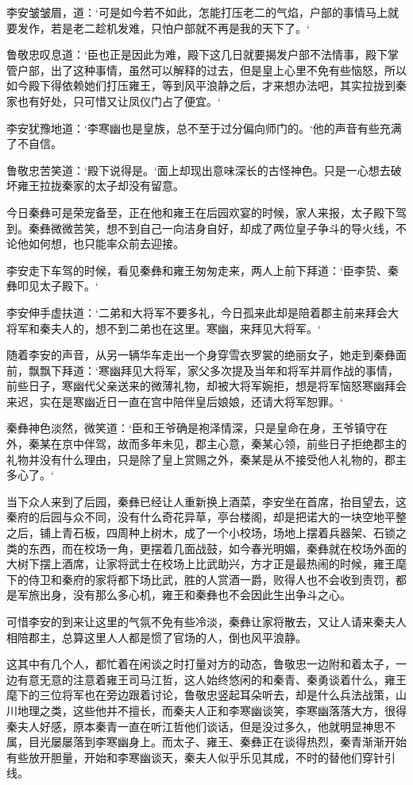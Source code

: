李安皱皱眉，道：‘可是如今若不如此，怎能打压老二的气焰，户部的事情马上就要发作，若是老二趁机发难，只怕户部就不再是我的天下了。‘

鲁敬忠叹息道：‘臣也正是因此为难，殿下这几日就要揭发户部不法情事，殿下掌管户部，出了这种事情，虽然可以解释的过去，但是皇上心里不免有些恼怒，所以如今殿下得依赖她们打压雍王，等到风平浪静之后，才来想办法吧，其实拉拢到秦家也有好处，只可惜又让凤仪门占了便宜。‘

李安犹豫地道：‘李寒幽也是皇族，总不至于过分偏向师门的。‘他的声音有些充满了不自信。

鲁敬忠苦笑道：‘殿下说得是。‘面上却现出意味深长的古怪神色。只是一心想去破坏雍王拉拢秦家的太子却没有留意。

今日秦彝可是荣宠备至，正在他和雍王在后园欢宴的时候，家人来报，太子殿下驾到。秦彝微微苦笑，想不到自己一向洁身自好，却成了两位皇子争斗的导火线，不论他如何想，也只能率众前去迎接。

李安走下车驾的时候，看见秦彝和雍王匆匆走来，两人上前下拜道：‘臣李贽、秦彝叩见太子殿下。‘

李安伸手虚扶道：‘二弟和大将军不要多礼，今日孤来此却是陪着郡主前来拜会大将军和秦夫人的，想不到二弟也在这里。寒幽，来拜见大将军。‘

随着李安的声音，从另一辆华车走出一个身穿雪衣罗裳的绝丽女子，她走到秦彝面前，飘飘下拜道：‘寒幽拜见大将军，家父多次提及当年和将军并肩作战的事情，前些日子，寒幽代父亲送来的微薄礼物，却被大将军婉拒，想是将军恼怒寒幽拜会来迟，实在是寒幽近日一直在宫中陪伴皇后娘娘，还请大将军恕罪。‘

秦彝神色淡然，微笑道：‘臣和王爷确是袍泽情深，只是皇命在身，王爷镇守在外，秦某在京中伴驾，故而多年未见，郡主心意，秦某心领，前些日子拒绝郡主的礼物并没有什么理由，只是除了皇上赏赐之外，秦某是从不接受他人礼物的，郡主多心了。‘

当下众人来到了后园，秦彝已经让人重新换上酒菜，李安坐在首席，抬目望去，这秦府的后园与众不同，没有什么奇花异草，亭台楼阁，却是把诺大的一块空地平整之后，铺上青石板，四周种上树木，成了一个小校场，场地上摆着兵器架、石锁之类的东西，而在校场一角，更摆着几面战鼓，如今春光明媚，秦彝就在校场外面的大树下摆上酒席，让家将武士在校场上比武助兴，方才正是最热闹的时候，雍王麾下的侍卫和秦府的家将都下场比武，胜的人赏酒一爵，败得人也不会收到责罚，都是军旅出身，没有那么多心机，雍王和秦彝也不会因此生出争斗之心。

可惜李安的到来让这里的气氛不免有些冷淡，秦彝让家将散去，又让人请来秦夫人相陪郡主，总算这里人人都是惯了官场的人，倒也风平浪静。

这其中有几个人，都忙着在闲谈之时打量对方的动态，鲁敬忠一边附和着太子，一边有意无意的注意着雍王司马江哲，这人始终悠闲的和秦青、秦勇谈着什么，雍王麾下的三位将军也在旁边跟着讨论，鲁敬忠竖起耳朵听去，却是什么兵法战策，山川地理之类，这些他并不擅长，而秦夫人正和李寒幽谈笑，李寒幽落落大方，很得秦夫人好感，原本秦青一直在听江哲他们谈话，但是没过多久，他就明显神思不属，目光屡屡落到李寒幽身上。而太子、雍王、秦彝正在谈得热烈，秦青渐渐开始有些放开胆量，开始和李寒幽谈天，秦夫人似乎乐见其成，不时的替他们穿针引线。


